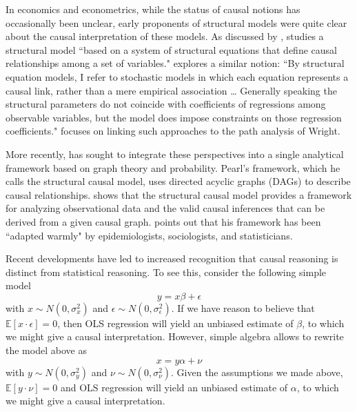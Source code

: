 \documentclass[11pt]{amsart}
\begin{document}
In economics and econometrics, while the status of causal notions has occasionally been unclear, early proponents of structural models were quite clear about the causal interpretation of these models.
As discussed by \citet{Heckman:2015ez}, \citet{Haavelmo:1943cl,Haavelmo:1944jq} studies a structural model ``based on a system of structural equations that define causal relationships among a set of variables."
\citep[p. 979]{Goldberger:1972cq} explores a similar notion: ``By structural equation models, I refer to stochastic models in which each equation represents a causal link, rather than a mere empirical association \dots
Generally speaking the structural parameters do not coincide with coefficients of regressions among observable variables, but the model does impose constraints on those regression coefficients."
\citep[p.979]{Goldberger:1972cq} focuses on linking such approaches to the path analysis of Wright.

More recently, \citet{Pearl:2009kh} has sought to integrate these perspectives into a single analytical framework based on graph theory and probability.
Pearl's framework, which he calls the structural causal model, uses directed acyclic graphs (DAGs) to describe causal relationships.
\citet{Pearl:2009kh} shows that the structural causal model provides a framework for analyzing observational data and the valid causal inferences that can be derived from a given causal graph.
\citet[p. 698]{Pearl:2011jd} points out that his framework has been ``adapted warmly" by epidemiologists, sociologists, and statisticians.

Recent developments have led to increased recognition that causal reasoning is distinct from statistical reasoning.
To see this, consider the following simple model
\[ y = x \beta + \epsilon \]
with $x \sim N(0, \sigma_x^2)$ and $\epsilon  \sim N(0, \sigma_{\epsilon}^2)$.
If we have reason to believe that $\mathbb{E}[x \cdot \epsilon] = 0$, then OLS regression will yield an unbiased estimate of $\beta$, to which we might give a causal interpretation.
However, simple algebra allows to rewrite the model above as 
\[ x = y \alpha + \nu \]
with $y \sim N(0, \sigma_y^2)$ and $\nu  \sim N(0, \sigma_{\nu}^2)$.
Given the assumptions we made above, $\mathbb{E}[y \cdot \nu] = 0$ and OLS regression will yield an unbiased estimate of $\alpha$, to which we might give a causal interpretation.
\end{document}
